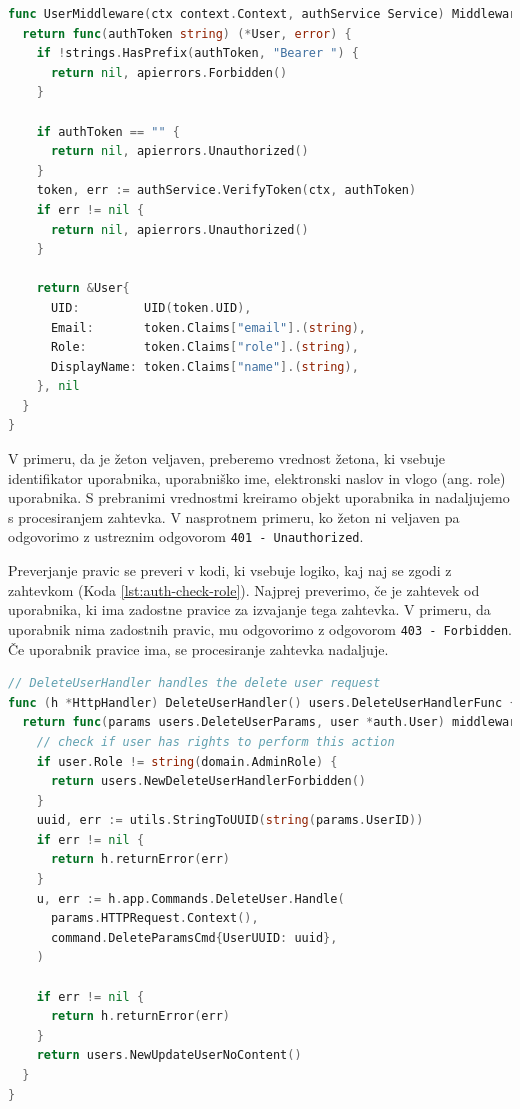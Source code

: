 \documentclass[a4paper, 12pt]{book}
\begin{document}
\begin{lstlisting}[language=go,style=mystyle,caption={Izsek kode za preverjanje pristnosti uporabnika.},label=lst:auth-middleware]
func UserMiddleware(ctx context.Context, authService Service) MiddlewareFunc {
  return func(authToken string) (*User, error) {
    if !strings.HasPrefix(authToken, "Bearer ") {
      return nil, apierrors.Forbidden()
    }
    
    if authToken == "" {
      return nil, apierrors.Unauthorized()
    }
    token, err := authService.VerifyToken(ctx, authToken)
    if err != nil {
      return nil, apierrors.Unauthorized()
    }
    
    return &User{
      UID:         UID(token.UID),
      Email:       token.Claims["email"].(string),
      Role:        token.Claims["role"].(string),
      DisplayName: token.Claims["name"].(string),
    }, nil
  }
}
\end{lstlisting}

V primeru, da je žeton veljaven, preberemo vrednost žetona, ki vsebuje identifikator uporabnika, uporabniško ime, elektronski naslov in vlogo (ang. role) uporabnika. S prebranimi vrednostmi kreiramo objekt uporabnika in nadaljujemo s procesiranjem zahtevka. V nasprotnem primeru, ko žeton ni veljaven pa odgovorimo z ustreznim odgovorom \verb=401 - Unauthorized=. 

Preverjanje pravic se preveri v kodi, ki vsebuje logiko, kaj naj se zgodi z zahtevkom (Koda \ref{lst:auth-check-role}). Najprej preverimo, če je zahtevek od uporabnika, ki ima zadostne pravice za izvajanje tega zahtevka. V primeru, da uporabnik nima zadostnih pravic, mu odgovorimo z odgovorom \verb=403 - Forbidden=. Če uporabnik pravice ima, se procesiranje zahtevka nadaljuje.

\begin{lstlisting}[language=go,style=mystyle,caption={Izsek kode za preverjanje pravic uporabnika.},label=lst:auth-check-role]
// DeleteUserHandler handles the delete user request
func (h *HttpHandler) DeleteUserHandler() users.DeleteUserHandlerFunc {
  return func(params users.DeleteUserParams, user *auth.User) middleware.Responder {
    // check if user has rights to perform this action
    if user.Role != string(domain.AdminRole) {
      return users.NewDeleteUserHandlerForbidden()
    }
    uuid, err := utils.StringToUUID(string(params.UserID))
    if err != nil {
      return h.returnError(err)
    }
    u, err := h.app.Commands.DeleteUser.Handle(
      params.HTTPRequest.Context(), 
      command.DeleteParamsCmd{UserUUID: uuid},
    )

    if err != nil {
      return h.returnError(err)
    }
    return users.NewUpdateUserNoContent()
  }
}
\end{lstlisting}
\end{document}
